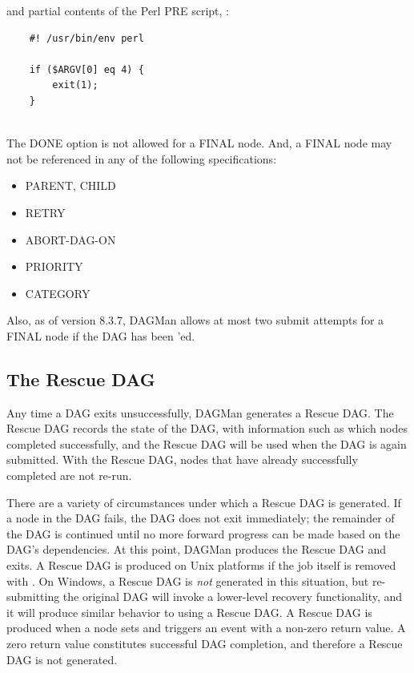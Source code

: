 and partial contents of the Perl PRE script, :
\begin{verbatim}
    #! /usr/bin/env perl
    
    if ($ARGV[0] eq 4) {
        exit(1);
    }
   
\end{verbatim}


The DONE option is not allowed for a FINAL node.
And, a FINAL node may not be referenced in any of the following
specifications:
\begin{itemize}
\item PARENT, CHILD
\item RETRY
\item ABORT-DAG-ON
\item PRIORITY
\item CATEGORY
\end{itemize}

Also, as of version 8.3.7, DAGMan allows at most two submit attempts
for a FINAL node if the DAG has been 'ed.

\subsection{\label{sec:DAGMan-rescue}The Rescue DAG}

Any time a DAG exits unsuccessfully, DAGMan generates a Rescue DAG.  
The Rescue DAG records the state of the DAG, 
with information such as which nodes completed successfully,
and the Rescue DAG will be used when the DAG is again submitted.
With the Rescue DAG,
nodes that have already successfully completed are not re-run.

There are a variety of circumstances under which a Rescue DAG
is generated.
If a node in the DAG fails, the DAG does not exit immediately;
the remainder of the DAG is continued until no more forward
progress can be made based on the DAG's dependencies.
At this point, DAGMan produces the Rescue DAG and exits.
A Rescue DAG is produced on Unix platforms if the
 job itself is removed with .
On Windows, a Rescue DAG is \emph{not} generated in this situation,
but re-submitting the original DAG will invoke a lower-level 
recovery functionality,
and it will produce similar behavior to using a Rescue DAG.
A Rescue DAG is produced when a node sets and triggers
an  event with a non-zero return value.
A zero return value constitutes successful DAG completion, 
and therefore a Rescue DAG is not generated.

